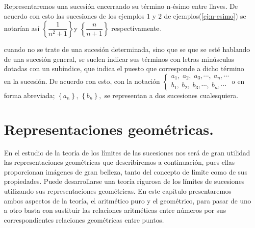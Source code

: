 \documentclass[oneside,english,spanish,2m,twoside,svgnames,x11names,HTML,twoside,12pt]{libro-matua}\usepackage[]{graphicx}\usepackage[]{color}
\begin{document}
\singlespace

\notacion Representaremos una sucesión encerrando su término n-ésimo
entre llaves. De acuerdo con esto las sucesiones de los ejemplos 1
y 2 de ejemplos(\ref{ej:n-esimo}) se notarían así $\left\{ \dfrac{1}{n^{2}+1}\right\} $y
$\left\{ \dfrac{n}{n+1}\right\} $ respectivamente.

cuando no se trate de una sucesión determinada, sino que se que se
esté hablando de una sucesión general, se suelen indicar sus términos
con letras minúsculas dotadas con un subíndice, que indica el puesto
que corresponde a dicho término en la sucesión. De acuerdo con esto,
con la notación $\left\{ \begin{array}{c}
a_{1},\;a_{2},\;a_{3},\cdots,\;a_{n},\cdots\\
b_{1},\;b_{2},\;b_{3},\cdots,\;b_{n},\cdots
\end{array}\right.$o en forma abreviada; $\left\{ a_{n}\right\} $, $\left\{ b_{n}\right\} ,$
se representan a dos sucesiones cualesquiera.

\section{Representaciones geométricas.}

En el estudio de la teoría de los límites de las sucesiones nos será
de gran utilidad las representaciones geométricas que describiremos
a continuación, pues ellas proporcionan imágenes de gran belleza,
tanto del concepto de límite como de sus propiedades. Puede desarrollarse
una teoría rigurosa de los límites de sucesiones utilizando sus representaciones
geométricas. En este capítulo presentaremos ambos aspectos de la teoría,
el aritmético puro y el geométrico, para pasar de uno a otro basta
con sustituir las relaciones aritméticas entre números por sus correspondientes
relaciones geométricas entre puntos.
\end{document}
